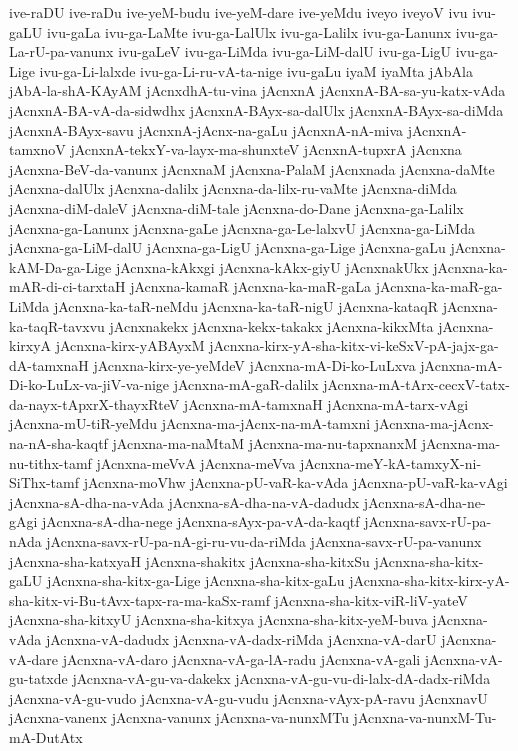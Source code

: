 {ive-raDU
ive-raDu
ive-yeM-budu
ive-yeM-dare
ive-yeMdu
iveyo
iveyoV
ivu
ivu-gaLU
ivu-gaLa
ivu-ga-LaMte
ivu-ga-LalUlx
ivu-ga-Lalilx
ivu-ga-Lanunx
ivu-ga-La-rU-pa-vanunx
ivu-gaLeV
ivu-ga-LiMda
ivu-ga-LiM-dalU
ivu-ga-LigU
ivu-ga-Lige
ivu-ga-Li-lalxde
ivu-ga-Li-ru-vA-ta-nige
ivu-gaLu
iyaM
iyaMta
jAbAla
jAbA-la-shA-KAyAM
jAcnxdhA-tu-vina
jAcnxnA
jAcnxnA-BA-sa-yu-katx-vAda
jAcnxnA-BA-vA-da-sidwdhx
jAcnxnA-BAyx-sa-dalUlx
jAcnxnA-BAyx-sa-diMda
jAcnxnA-BAyx-savu
jAcnxnA-jAcnx-na-gaLu
jAcnxnA-nA-miva
jAcnxnA-tamxnoV
jAcnxnA-tekxY-va-layx-ma-shunxteV
jAcnxnA-tupxrA
jAcnxna
jAcnxna-BeV-da-vanunx
jAcnxnaM
jAcnxna-PalaM
jAcnxnada
jAcnxna-daMte
jAcnxna-dalUlx
jAcnxna-dalilx
jAcnxna-da-lilx-ru-vaMte
jAcnxna-diMda
jAcnxna-diM-daleV
jAcnxna-diM-tale
jAcnxna-do-Dane
jAcnxna-ga-Lalilx
jAcnxna-ga-Lanunx
jAcnxna-gaLe
jAcnxna-ga-Le-lalxvU
jAcnxna-ga-LiMda
jAcnxna-ga-LiM-dalU
jAcnxna-ga-LigU
jAcnxna-ga-Lige
jAcnxna-gaLu
jAcnxna-kAM-Da-ga-Lige
jAcnxna-kAkxgi
jAcnxna-kAkx-giyU
jAcnxnakUkx
jAcnxna-ka-mAR-di-ci-tarxtaH
jAcnxna-kamaR
jAcnxna-ka-maR-gaLa
jAcnxna-ka-maR-ga-LiMda
jAcnxna-ka-taR-neMdu
jAcnxna-ka-taR-nigU
jAcnxna-kataqR
jAcnxna-ka-taqR-tavxvu
jAcnxnakekx
jAcnxna-kekx-takakx
jAcnxna-kikxMta
jAcnxna-kirxyA
jAcnxna-kirx-yABAyxM
jAcnxna-kirx-yA-sha-kitx-vi-keSxV-pA-jajx-ga-dA-tamxnaH
jAcnxna-kirx-ye-yeMdeV
jAcnxna-mA-Di-ko-LuLxva
jAcnxna-mA-Di-ko-LuLx-va-jiV-va-nige
jAcnxna-mA-gaR-dalilx
jAcnxna-mA-tArx-cecxV-tatx-da-nayx-tApxrX-thayxRteV
jAcnxna-mA-tamxnaH
jAcnxna-mA-tarx-vAgi
jAcnxna-mU-tiR-yeMdu
jAcnxna-ma-jAcnx-na-mA-tamxni
jAcnxna-ma-jAcnx-na-nA-sha-kaqtf
jAcnxna-ma-naMtaM
jAcnxna-ma-nu-tapxnanxM
jAcnxna-ma-nu-tithx-tamf
jAcnxna-meVvA
jAcnxna-meVva
jAcnxna-meY-kA-tamxyX-ni-SiThx-tamf
jAcnxna-moVhw
jAcnxna-pU-vaR-ka-vAda
jAcnxna-pU-vaR-ka-vAgi
jAcnxna-sA-dha-na-vAda
jAcnxna-sA-dha-na-vA-dadudx
jAcnxna-sA-dha-ne-gAgi
jAcnxna-sA-dha-nege
jAcnxna-sAyx-pa-vA-da-kaqtf
jAcnxna-savx-rU-pa-nAda
jAcnxna-savx-rU-pa-nA-gi-ru-vu-da-riMda
jAcnxna-savx-rU-pa-vanunx
jAcnxna-sha-katxyaH
jAcnxna-shakitx
jAcnxna-sha-kitxSu
jAcnxna-sha-kitx-gaLU
jAcnxna-sha-kitx-ga-Lige
jAcnxna-sha-kitx-gaLu
jAcnxna-sha-kitx-kirx-yA-sha-kitx-vi-Bu-tAvx-tapx-ra-ma-kaSx-ramf
jAcnxna-sha-kitx-viR-liV-yateV
jAcnxna-sha-kitxyU
jAcnxna-sha-kitxya
jAcnxna-sha-kitx-yeM-buva
jAcnxna-vAda
jAcnxna-vA-dadudx
jAcnxna-vA-dadx-riMda
jAcnxna-vA-darU
jAcnxna-vA-dare
jAcnxna-vA-daro
jAcnxna-vA-ga-lA-radu
jAcnxna-vA-gali
jAcnxna-vA-gu-tatxde
jAcnxna-vA-gu-va-dakekx
jAcnxna-vA-gu-vu-di-lalx-dA-dadx-riMda
jAcnxna-vA-gu-vudo
jAcnxna-vA-gu-vudu
jAcnxna-vAyx-pA-ravu
jAcnxnavU
jAcnxna-vanenx
jAcnxna-vanunx
jAcnxna-va-nunxMTu
jAcnxna-va-nunxM-Tu-mA-DutAtx
}
